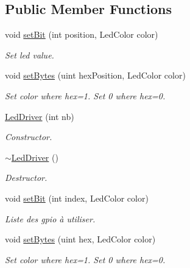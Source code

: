 \subsection*{Public Member Functions}
\begin{DoxyCompactItemize}
\item 
void \hyperlink{classLedDriver_a1856fb030d88bcacdc37dfce7f0f8136}{set\+Bit} (int position, Led\+Color color)
\begin{DoxyCompactList}\small\item\em Set led value. \end{DoxyCompactList}\item 
void \hyperlink{classLedDriver_a765b8b642e13715ccaff1cbcff01dc97}{set\+Bytes} (uint hex\+Position, Led\+Color color)
\begin{DoxyCompactList}\small\item\em Set color where hex=1. Set 0 where hex=0. \end{DoxyCompactList}\item 
\mbox{\label{classLedDriver_a23265705c54ed45e32b91ed9b2f4e0b6}} 
\hyperlink{classLedDriver_a23265705c54ed45e32b91ed9b2f4e0b6}{Led\+Driver} (int nb)
\begin{DoxyCompactList}\small\item\em Constructor. \end{DoxyCompactList}\item 
\mbox{\label{classLedDriver_a8b6afd79e2715068ff08c51a9df28065}} 
\hyperlink{classLedDriver_a8b6afd79e2715068ff08c51a9df28065}{$\sim$\+Led\+Driver} ()
\begin{DoxyCompactList}\small\item\em Destructor. \end{DoxyCompactList}\item 
\mbox{\label{classLedDriver_af5ec63943cb92b14a887fdd2a5491e93}} 
void \hyperlink{classLedDriver_af5ec63943cb92b14a887fdd2a5491e93}{set\+Bit} (int index, Led\+Color color)
\begin{DoxyCompactList}\small\item\em Liste des gpio à utiliser. \end{DoxyCompactList}\item 
void \hyperlink{classLedDriver_a66512dd673a81681d3597e301af13759}{set\+Bytes} (uint hex, Led\+Color color)
\begin{DoxyCompactList}\small\item\em Set color where hex=1. Set 0 where hex=0. \end{DoxyCompactList}\item 

\end{DoxyCompactItemize}
